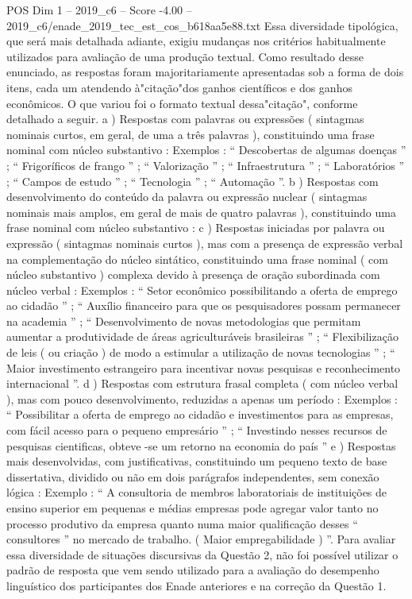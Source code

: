 \begin{textsample}{POS Dim 1 – 2019\_c6 – Score -4.00 – 2019\_c6/enade\_2019\_tec\_est\_cos\_b618aa5e88.txt}
Essa diversidade tipológica, que será mais detalhada adiante, exigiu mudanças nos critérios habitualmente utilizados para avaliação de uma produção textual.
Como resultado desse enunciado, as respostas foram majoritariamente apresentadas sob a forma de dois itens, cada um atendendo à"citação"dos ganhos científicos e dos ganhos econômicos.
O que variou foi o formato textual dessa"citação", conforme detalhado a seguir. a ) Respostas com palavras ou expressões ( sintagmas nominais curtos, em geral, de uma a três palavras ), constituindo uma frase nominal com núcleo substantivo : Exemplos : “ Descobertas de algumas doenças ” ; “ Frigoríficos de frango ” ; “ Valorização ” ; “ Infraestrutura ” ; “ Laboratórios ” ; “ Campos de estudo ” ; “ Tecnologia ” ; “ Automação ”. b ) Respostas com desenvolvimento do conteúdo da palavra ou expressão nuclear ( sintagmas nominais mais amplos, em geral de mais de quatro palavras ), constituindo uma frase nominal com núcleo substantivo : c ) Respostas iniciadas por palavra ou expressão ( sintagmas nominais curtos ), mas com a presença de expressão verbal na complementação do núcleo sintático, constituindo uma frase nominal ( com núcleo substantivo ) complexa devido à presença de oração subordinada com núcleo verbal : Exemplos : “ Setor econômico possibilitando a oferta de emprego ao cidadão ” ; “ Auxílio financeiro para que os pesquisadores possam permanecer na academia ” ; “ Desenvolvimento de novas metodologias que permitam aumentar a produtividade de áreas agriculturáveis brasileiras ” ; “ Flexibilização de leis ( ou criação ) de modo a estimular a utilização de novas tecnologias ” ; “ Maior investimento estrangeiro para incentivar novas pesquisas e reconhecimento internacional ”. d ) Respostas com estrutura frasal completa ( com núcleo verbal ), mas com pouco desenvolvimento, reduzidas a apenas um período : Exemplos : “ Possibilitar a oferta de emprego ao cidadão e investimentos para as empresas, com fácil acesso para o pequeno empresário ” ; “ Investindo nesses recursos de pesquisas cientificas, obteve -se um retorno na economia do país ” e ) Respostas mais desenvolvidas, com justificativas, constituindo um pequeno texto de base dissertativa, dividido ou não em dois parágrafos independentes, sem conexão lógica : Exemplo : “ A consultoria de membros laboratoriais de instituições de ensino superior em pequenas e médias empresas pode agregar valor tanto no processo produtivo da empresa quanto numa maior qualificação desses “ consultores ” no mercado de trabalho. ( Maior empregabilidade ) ”.
Para avaliar essa diversidade de situações discursivas da Questão 2, não foi possível utilizar o padrão de resposta que vem sendo utilizado para a avaliação do desempenho linguístico dos participantes dos Enade anteriores e na correção da Questão 1.

\end{textsample}
